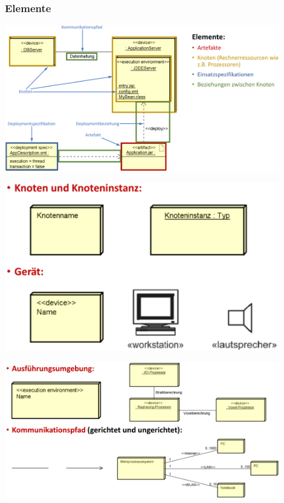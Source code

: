 \documentclass[11pt, a4paper]{article}
\begin{document}
\vspace{2em}

\raggedright \subsubsection{Elemente}

\centering \includegraphics[width=0.9\textwidth]{Verteilung-00.png}

\newpage

\begin{minipage}[h]{0.45\textwidth}
    \raggedright \includegraphics[width=0.9\textwidth]{Verteilung-01.png} 
\end{minipage}
\begin{minipage}[h]{0.45\textwidth}
    \raggedleft \includegraphics[width=0.9\textwidth]{Verteilung-02.png}   
\end{minipage}
\end{document}

